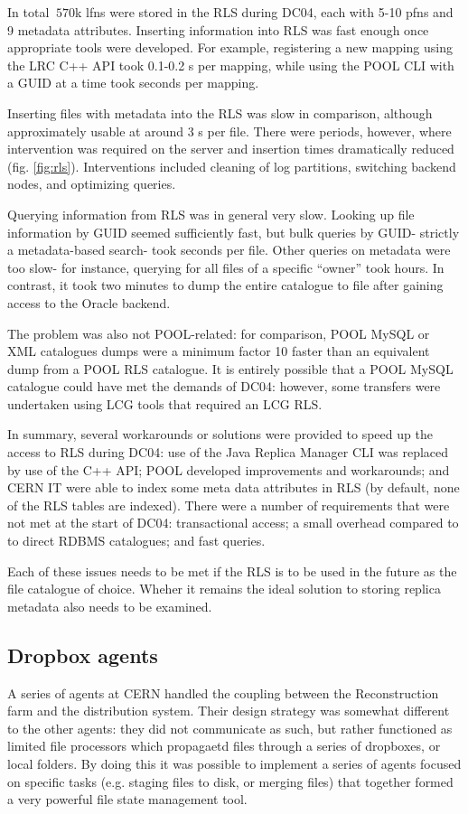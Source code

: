 \documentclass{cmspaper}
\begin{document}
In total $~570$k lfns were stored in the RLS during DC04, each with
5-10 pfns and 9 metadata attributes. Inserting information into RLS
was fast enough once appropriate tools were developed. For example,
registering a new mapping using the LRC C++ API took 0.1-0.2 s per
mapping, while using the POOL CLI with a GUID at a time took seconds
per mapping.

Inserting files with metadata into the RLS was slow in comparison,
although approximately usable at around 3 s per file. There were
periods, however, where intervention was required on the server and
insertion times dramatically reduced
(fig. \ref{fig:rls}). Interventions included cleaning of log
partitions, switching backend nodes, and optimizing queries.

Querying information from RLS was in general very slow. Looking up
file information by GUID seemed sufficiently fast, but bulk queries by
GUID- strictly a metadata-based search- took seconds per file. Other
queries on metadata were too slow- for instance, querying for all
files of a specific ``owner'' took hours. In contrast, it took two
minutes to dump the entire catalogue to file after gaining access to
the Oracle backend.

The problem was also not POOL-related: for comparison, POOL MySQL or
XML catalogues dumps were a minimum factor 10 faster than an
equivalent dump from a POOL RLS catalogue. It is entirely possible
that a POOL MySQL catalogue could have met the demands of DC04:
however, some transfers were undertaken using LCG tools that required
an LCG RLS.

In summary, several workarounds or solutions were provided to speed up
the access to RLS during DC04: use of the Java Replica Manager CLI was
replaced by use of the C++ API; POOL developed improvements and
workarounds; and CERN IT were able to index some meta data attributes
in RLS (by default, none of the RLS tables are indexed). There were a
number of requirements that were not met at the start of DC04:
transactional access; a small overhead compared to to direct RDBMS
catalogues; and fast queries.

Each of these issues needs to be met if the RLS is to be used in the
future as the file catalogue of choice. Wheher it remains the ideal
solution to storing replica metadata also needs to be examined.

\subsection{Dropbox agents}
A series of agents at CERN handled the coupling between the
Reconstruction farm and the distribution system. Their design strategy
was somewhat different to the other agents: they did not communicate
as such, but rather functioned as limited file processors which
propagaetd files through a series of dropboxes, or local folders. By
doing this it was possible to implement a series of agents focused on
specific tasks (e.g. staging files to disk, or merging files) that
together formed a very powerful file state management tool.
\end{document}
